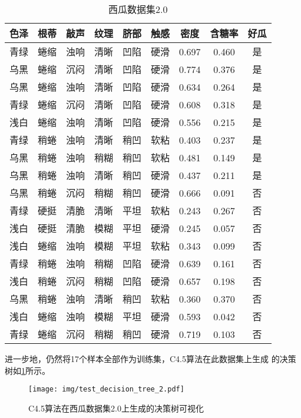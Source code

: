 \documentclass[main.tex]{subfiles}
\begin{document}
\begin{table}[]
    \caption{西瓜数据集2.0}
    \label{watermelon_2}
    \centering
    \begin{tabular}{ccccccccc}
    \hline
    色泽 & 根蒂 & 敲声 & 纹理 & 脐部 & 触感 & 密度    & 含糖率   & 好瓜 \\ \hline
    青绿 & 蜷缩 & 浊响 & 清晰 & 凹陷 & 硬滑 & 0.697 & 0.460 & 是  \\
    乌黑 & 蜷缩 & 沉闷 & 清晰 & 凹陷 & 硬滑 & 0.774 & 0.376 & 是  \\
    乌黑 & 蜷缩 & 浊响 & 清晰 & 凹陷 & 硬滑 & 0.634 & 0.264 & 是  \\
    青绿 & 蜷缩 & 沉闷 & 清晰 & 凹陷 & 硬滑 & 0.608 & 0.318 & 是  \\
    浅白 & 蜷缩 & 浊响 & 清晰 & 凹陷 & 硬滑 & 0.556 & 0.215 & 是  \\
    青绿 & 稍蜷 & 浊响 & 清晰 & 稍凹 & 软粘 & 0.403 & 0.237 & 是  \\
    乌黑 & 稍蜷 & 浊响 & 稍糊 & 稍凹 & 软粘 & 0.481 & 0.149 & 是  \\
    乌黑 & 稍蜷 & 浊响 & 清晰 & 稍凹 & 硬滑 & 0.437 & 0.211 & 是  \\ \hline
    乌黑 & 稍蜷 & 沉闷 & 稍糊 & 稍凹 & 硬滑 & 0.666 & 0.091 & 否  \\
    青绿 & 硬挺 & 清脆 & 清晰 & 平坦 & 软粘 & 0.243 & 0.267 & 否  \\
    浅白 & 硬挺 & 清脆 & 模糊 & 平坦 & 硬滑 & 0.245 & 0.057 & 否  \\
    浅白 & 蜷缩 & 浊响 & 模糊 & 平坦 & 软粘 & 0.343 & 0.099 & 否  \\
    青绿 & 稍蜷 & 浊响 & 稍糊 & 凹陷 & 硬滑 & 0.639 & 0.161 & 否  \\
    浅白 & 稍蜷 & 沉闷 & 稍糊 & 凹陷 & 硬滑 & 0.657 & 0.198 & 否  \\
    乌黑 & 稍蜷 & 浊响 & 清晰 & 稍凹 & 软粘 & 0.360 & 0.370 & 否  \\
    浅白 & 蜷缩 & 浊响 & 模糊 & 平坦 & 硬滑 & 0.593 & 0.042 & 否  \\
    青绿 & 蜷缩 & 沉闷 & 稍糊 & 稍凹 & 硬滑 & 0.719 & 0.103 & 否  \\ \hline
    \end{tabular}
\end{table}

进一步地，仍然将17个样本全部作为训练集，C4.5算法在此数据集上生成
的决策树如\ref{dt_c45_vis}所示。

\begin{figure}[htbp!]
    \centering \texttt{[image: img/test\_decision\_tree\_2.pdf]} 
    \caption{C4.5算法在西瓜数据集2.0上生成的决策树可视化}
    \label{dt_c45_vis}
\end{figure}
\end{document}
